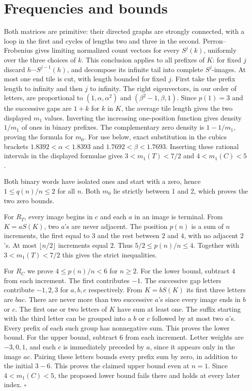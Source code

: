 \documentclass[10pt]{article}
\begin{document}
\section{Frequencies and bounds}
Both matrices are primitive: their directed graphs are strongly connected, with a loop
in the first and cycles of lengths two and three in the second. Perron--Frobenius gives
limiting normalized count vectors for every $S^j(k)$, uniformly over the three choices of
$k$. This conclusion applies to all prefixes of $K$: for fixed $j$ discard
$h\cdots S^{j-1}(h)$, and decompose its infinite tail into complete $S^j$-images.
At most one end tile is cut, with length bounded for fixed $j$. First take the prefix
length to infinity and then $j$ to infinity. The right eigenvectors, in our order of
letters, are proportional to $(1,\alpha,\alpha^2)$ and $(\beta^2-1,\beta,1)$.
Since $p(1)=3$ and the successive gaps are $1+k$ for $k$ in $K$, the average tile
length gives the two displayed $m_1$ values. Inverting the increasing one-position
function gives density $1/m_1$ of ones in binary prefixes. The complementary zero
density is $1-1/m_1$, proving the formula for $m_0$. For use below, exact substitution
in the cubics brackets $1.8392<\alpha<1.8393$ and $1.7692<\beta<1.7693$.
Inserting these rational intervals in the displayed formulae gives
$3<m_1(T)<7/2$ and $4<m_1(C)<5$.

Both binary words have isolated ones and start with a zero, hence $1\le q(n)/n\le2$
for all $n$. Both $m_0$ lie strictly between 1 and 2, which proves the two zero bounds.

For $R_T$, every image begins in $c$ and each $a$ in an image is terminal.
From $K=aS(K)$, two $a$'s are never adjacent. The position $p(n)$ is a sum of $n$
increments, the first equal to $3$ and the rest between $2$ and $4$, with no adjacent
$2$'s. At most $\lfloor n/2\rfloor$ increments equal $2$. Thus
$5/2\le p(n)/n\le4$. Together with $3<m_1(T)<7/2$ this gives the strict inequalities.

For $R_C$ we prove $4\le p(n)/n<6$ for $n\ge2$. For the lower bound, subtract $4$ from
each increment. The first contributes $-1$. The successive gap letters contribute
$-1,2,3$ for $a,b,c$ respectively. From $K=bS(K)$ its first three letters are $bac$.
There are never more than two successive $a$'s since every image ends in $b$ or $c$.
The first one or two letters of $K$ have sum at least one. The suffix starting with the
third letter can be grouped into a $b$ or $c$ followed by at most two $a$'s. Every
prefix of each such group has nonnegative sum. This proves the lower bound. For the
upper bound, subtract $6$ from each increment. Letter weights are $-3,0,1$, and each
$c$ is immediately preceded by $a$, since it appears only in the image $ac$. Pairing
these letters bounds every prefix sum by zero, in addition to the initial $3-6$.
This proves the claimed upper bound even at $n=1$. Since $4<m_1(C)<5$,
the proposed lower bound fails there and holds at every later index.
\hfill$\square$
\end{document}
